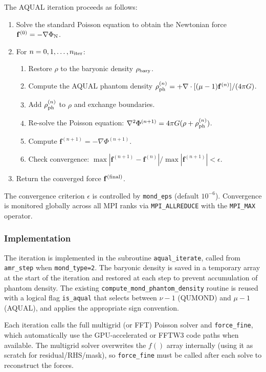 \documentclass[fleqn,usenatbib]{mnras}
\newcommand{\code}[1]{\texttt{#1}}
\newcommand{\rhoph}{\rho_{\rm ph}}
\begin{document}
The AQUAL iteration proceeds as follows:
\begin{enumerate}
\item Solve the standard Poisson equation to obtain the Newtonian force
  $\mathbf{f}^{(0)} = -\nabla\Phi_{\rm N}$.
\item For $n = 0, 1, \ldots, n_{\rm iter}$:
  \begin{enumerate}
  \item Restore $\rho$ to the baryonic density $\rho_{\rm bary}$.
  \item Compute the AQUAL phantom density
    $\rhoph^{(n)} = +\nabla\cdot[(\mu-1)\mathbf{f}^{(n)}]/(4\pi G)$.
  \item Add $\rhoph^{(n)}$ to $\rho$ and exchange boundaries.
  \item Re-solve the Poisson equation:
    $\nabla^2\Phi^{(n+1)} = 4\pi G(\rho + \rhoph^{(n)})$.
  \item Compute $\mathbf{f}^{(n+1)} = -\nabla\Phi^{(n+1)}$.
  \item Check convergence:
    $\max|\mathbf{f}^{(n+1)} - \mathbf{f}^{(n)}| /
    \max|\mathbf{f}^{(n+1)}| < \epsilon$.
  \end{enumerate}
\item Return the converged force $\mathbf{f}^{(\rm final)}$.
\end{enumerate}
The convergence criterion $\epsilon$ is controlled by
\code{mond\_eps} (default $10^{-6}$).  Convergence is monitored
globally across all MPI ranks via \code{MPI\_ALLREDUCE} with
the \code{MPI\_MAX} operator.

\subsubsection{Implementation}

The iteration is implemented in the subroutine \code{aqual\_iterate},
called from \code{amr\_step} when \code{mond\_type=2}.  The
baryonic density is saved in a temporary array at the start of the
iteration and restored at each step to prevent accumulation of
phantom density.  The existing \code{compute\_mond\_phantom\_density}
routine is reused with a logical flag \code{is\_aqual} that selects
between $\nu - 1$ (QUMOND) and $\mu - 1$ (AQUAL), and applies the
appropriate sign convention.

Each iteration calls the full multigrid (or FFT) Poisson solver and
\code{force\_fine}, which automatically use the GPU-accelerated or
FFTW3 code paths when available.  The multigrid solver overwrites
the $f()$ array internally (using it as scratch for
residual/RHS/mask), so \code{force\_fine} must be called after each
solve to reconstruct the forces.
\end{document}
